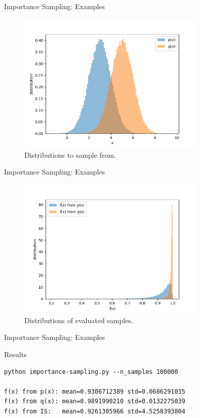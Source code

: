 \documentclass[10pt]{beamer}
\begin{document}
\begin{frame}{Importance Sampling: Examples}
\begin{figure}
  \includegraphics[width=0.8\textwidth]{code/is_dist.png}
  \caption{Distributions to sample from.}
\end{figure}
\end{frame}

\begin{frame}{Importance Sampling: Examples}
\begin{figure}
  \includegraphics[width=0.8\textwidth]{code/is_f_dist.png}
  \caption{Distributions of evaluated samples.}
\end{figure}
\end{frame}

\begin{frame}[fragile]{Importance Sampling: Examples}
\begin{block}{Results}
\begin{lstlisting}
python importance-sampling.py --n_samples 100000

f(x) from p(x): mean=0.9306712389 std=0.0686291035
f(x) from q(x): mean=0.9891990210 std=0.0132275039
f(x) from IS:   mean=0.9261305966 std=4.5258393804
\end{lstlisting}
\end{block}
\end{frame}
\end{document}
